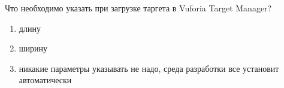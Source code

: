 
Что необходимо указать при загрузке таргета в Vuforia Target Manager?

\begin{enumerate}
    \item длину
    \item ширину
    \item никакие параметры указывать не надо, среда разработки все установит автоматически
\end{enumerate}